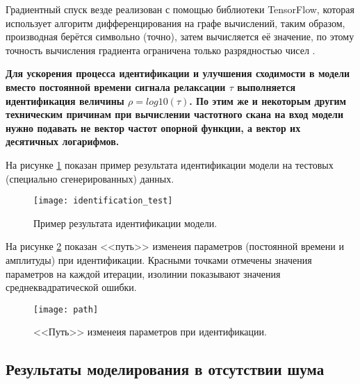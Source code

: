 	Градиентный спуск везде реализован с помощью библиотеки TensorFlow,
	которая использует алгоритм дифференцирования на графе вычислений,
	таким образом, производная берётся символьно (точно), затем вычисляется
	её значение, по этому точность вычисления градиента ограничена только
	разрядностью чисел \cite{hands_on_ml}.

	\textbf{Для ускорения процесса идентификации и улучшения сходимости
	в модели вместо постоянной времени сигнала релаксации $\tau$ 
	выполняется идентификация величины $\rho = log10(\tau)$. По этим же
	и некоторым	другим техническим причинам при вычислении частотного 
	скана на вход модели нужно подавать не вектор частот опорной 
	функции, а вектор их десятичных логарифмов.}

	На рисунке \ref{pic:identification_test} показан пример результата
	идентификации модели на тестовых (специально сгенерированных) данных.

	\begin{figure}[ht]
		\centering
		\texttt{[image: identification\_test]}
		\caption{Пример результата идентификации модели.}
		\label{pic:identification_test}
	\end{figure}

	На рисунке \ref{pic:param_path} показан <<путь>> изменеия параметров 
	(постоянной времени и амплитуды) при идентификации. Красными точками 
	отмечены значения параметров на каждой итерации, изолинии показывают 
	значения среднеквадратической ошибки.

	\begin{figure}[ht]
		\centering
		\texttt{[image: path]}
		\caption{<<Путь>> изменеия параметров при идентификации.}
		\label{pic:param_path}
	\end{figure}


	\subsection{Результаты моделирования в отсутствии шума}

